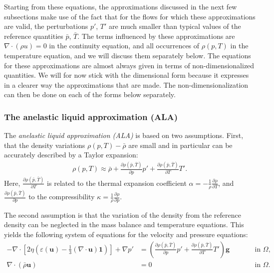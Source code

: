 \documentclass{article}
\begin{document}
Starting from these equations, the approximations discussed in the next few
subsections make use of the fact that for the flows for which these approximations are valid, the
perturbations $p'$, $T'$ are much smaller than typical values of the reference
quantities $\bar p$, $\bar T$. 
The terms influenced by these approximations are $\nabla \cdot (\rho u) =0$ in the 
continuity equation, and all occurrences of $\rho(p,T)$ in the temperature equation, 
and we will discuss them separately below. The equations for these approximations are
almost always given in terms of non-dimensionalized quantities. We will for
now stick with the dimensional form because it expresses in a clearer way the
approximations that are made. The non-dimensionalization can then be done on
each of the forms below separately.

\subsubsection{The anelastic liquid approximation (ALA)}
\label{sec:ala}

The \textit{anelastic liquid approximation (ALA)} is based on two assumptions.
First, that the density variations $\rho(p,T)-\bar\rho$ are small and in
particular can be accurately described by a Taylor expansion:
\begin{align*}
  \rho(p,T) \approx 
  \bar\rho 
  + \frac{\partial \rho(\bar p,\bar T)}{\partial p} p'
  + \frac{\partial \rho(\bar p,\bar T)}{\partial T} T'.
\end{align*}
Here, $\frac{\partial \rho(\bar p,\bar T)}{\partial T}$ is related to the
thermal expansion coefficient $\alpha = -\frac{1}{\rho}\frac{\partial \rho}{\partial T}$, 
and $\frac{\partial \rho(\bar p,\bar T)}{\partial p}$ to the compressibility
$\kappa = \frac{1}{\rho}\frac{\partial \rho}{\partial p}$.

The second assumption is that the variation of the density
from the reference density can be neglected in the mass balance and
temperature equations.
This yields the following system of equations for the velocity and pressure
equations:
\begin{align}
  \label{eq:stokes-ALA-1}
  -\nabla \cdot \left[2\eta \left(\varepsilon(\mathbf u)
                                  - \frac{1}{3}(\nabla \cdot \mathbf u)\mathbf 1\right)
                \right] + \nabla p' &=
  \left(\frac{\partial \rho(\bar p,\bar T)}{\partial p} p'
  + \frac{\partial \rho(\bar p,\bar T)}{\partial T} T' \right) \mathbf g
  & \qquad
  & \textrm{in $\Omega$},
  \\
  \label{eq:stokes-ALA-2}
  \nabla \cdot (\bar\rho \mathbf u) &= 0
  & \qquad
  & \textrm{in $\Omega$}.
\end{align}
\end{document}
